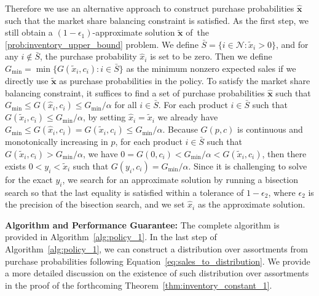 \documentclass[mnsc,non-blindrev]{informs3}
\theoremstyle{definition}
\begin{document}
Therefore we use an alternative approach to construct purchase probabilities $\hat{\bm{x}}$ such that the market share balancing constraint is satisfied. As the first step, we still obtain a \mbox{$(1-\epsilon_1)$-approximate} solution $\tilde{\bm{x}}$ of~the \ref{prob:inventory_upper_bound} problem. We define \mbox{$\bar{S}=\{i\in\mathcal{N}:\tilde{x}_i>0\}$}, and for any $i\notin \bar{S}$, the purchase probability $\hat{x}_i$ is set to be zero. Then we define \mbox{$G_{\min}=\min\{G(\tilde{x}_i,c_i):i\in\bar{S}\}$} as the minimum nonzero expected sales if we directly use $\tilde{\bm{x}}$ as purchase probabilities in the policy. To satisfy the market share balancing constraint, it suffices to find a set of purchase probabilities $\hat{\bm{x}}$ such that \mbox{$G_{\min}\leq G(\hat{x}_i,c_i)\leq G_{\min}/\alpha$} for all $i\in\bar{S}$. For each product $i\in\bar{S}$ such that $G(\tilde{x}_i,c_i)\leq G_{\min}/\alpha$, by setting $\hat{x}_i=\tilde{x}_i$ we already have \mbox{$G_{\min}\leq G(\hat{x}_i,c_i)=G(\tilde{x}_i,c_i)\leq G_{\min}/\alpha$.} Because $G(p,c)$ is continuous and monotonically increasing in $p$, for each product $i\in\bar{S}$ such that $G(\tilde{x}_i,c_i)>G_{\min}/\alpha$, we have $0=G(0,c_i)<G_{\min}/\alpha<G(\tilde{x}_i,c_i)$, then there exists $0<y_i<\tilde{x}_i$ such that $G(y_i,c_i)=G_{\min}/\alpha$. Since it is challenging to solve for the exact $y_i$, we search for an approximate solution by running a bisection search so that the last equality is satisfied within a tolerance of $1-\epsilon_2$, where $\epsilon_2$ is the precision of the bisection search, and we set $\hat{x}_i$ as the approximate solution.

\noindent\textbf{Algorithm and Performance Guarantee:} The complete algorithm is provided in Algorithm~\ref{alg:policy_1}. In the last step of Algorithm~\ref{alg:policy_1}, we can construct a distribution over assortments from purchase probabilities following Equation~\eqref{eq:sales_to_distribution}. We provide a more detailed discussion on the existence of such distribution over assortments in the proof of the forthcoming Theorem~\ref{thm:inventory_constant_1}.
\end{document}
